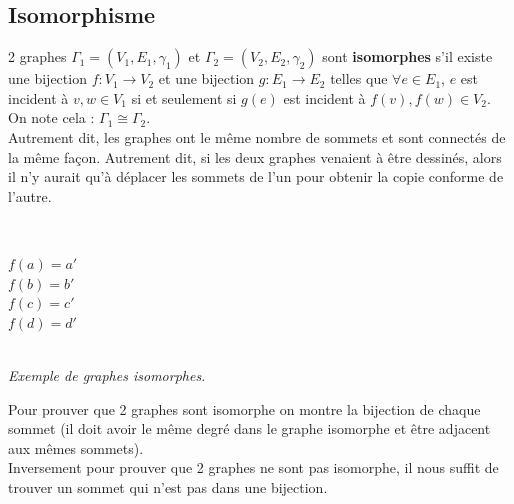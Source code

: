 \documentclass[11pt]{article}
\begin{document}
	\subsection{Isomorphisme}
		2 graphes $\Gamma_1 = (V_1,E_1,\gamma_1)$ et $\Gamma_2 = (V_2,E_2,\gamma_2)$ sont \textbf{isomorphes} s'il existe une bijection $f : V_1 \rightarrow V_2$ et une bijection $g : E_1 \rightarrow E_2$ telles que $\forall e \in E_1$, $e$ est incident à $v, w \in V_1$ si et seulement si $g(e)$ est incident à $f(v), f(w) \in V_2$. On note cela : $\Gamma_1 \cong \Gamma_2$.\\
		Autrement dit, les graphes ont le même nombre de sommets et sont connectés de la même façon. Autrement dit, si les deux graphes venaient à être dessinés, alors il n'y aurait qu'à déplacer les sommets de l'un pour obtenir la copie conforme de l'autre.\\
		\begin{center}
		\begin{minipage}{0.5\textwidth}
			 \\
			\end{minipage}\hfill
			\begin{minipage}{0.5\textwidth}
			\center
			$f(a) = a'$ \\
			$f(b) = b'$ \\
			$f(c) = c'$ \\
			$f(d) = d'$ 
			\end{minipage}\\
			\textit{Exemple de graphes isomorphes.}
		\end{center}
		
		Pour prouver que 2 graphes sont isomorphe on montre la bijection de chaque sommet (il doit avoir le même degré dans le graphe isomorphe et être adjacent aux mêmes sommets).\\
		Inversement pour prouver que 2 graphes ne sont pas isomorphe, il nous suffit de trouver un sommet qui n'est pas dans une bijection.
	
\end{document}
